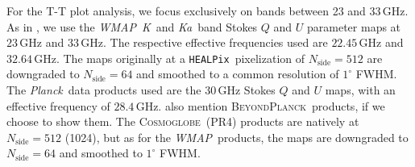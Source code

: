 \documentclass[twocolumn]{../../common/aa}
\def\WMAP{\emph{WMAP}}
\def\Planck{\emph{Planck}}
\def\healpix{\texttt{HEALPix}}
\newcommand{\red}[0]{\color{red}}
\newcommand{\BP}{\textsc{BeyondPlanck}}
\newcommand{\cosmoglobe}{\textsc{Cosmoglobe}}
\newcommand{\K}[0]{\textit K}
\newcommand{\Ka}[0]{\textit{Ka}}
\begin{document}
For the T-T plot  analysis, we focus exclusively on bands between 23 and 33\,GHz. As in \citet{fuskeland2014}, we use the \WMAP\ \K\ and \Ka\ band Stokes $Q$ and $U$ parameter maps at $23$\,GHz and $33$\,GHz. The respective effective frequencies used are $22.45$\,GHz and $32.64$\,GHz. The maps originally at a \healpix\ pixelization of $N_\textrm{side}=512$ are downgraded to $N_\textrm{side}=64$ and smoothed to a common resolution of $1^\circ$ FWHM.
The \Planck\ data products used are the $30$\,GHz Stokes $Q$ and $U$ maps, with an effective frequency of $28.4$\,GHz. {\red also mention \BP\ products, if we choose to show them.} The \cosmoglobe\ (PR4) products are natively at $N_\textrm{side}=512$ (1024), but as for the \WMAP\ products, the maps are downgraded to $N_\textrm{side}=64$ and smoothed to $1^\circ$ FWHM.  
\end{document}
